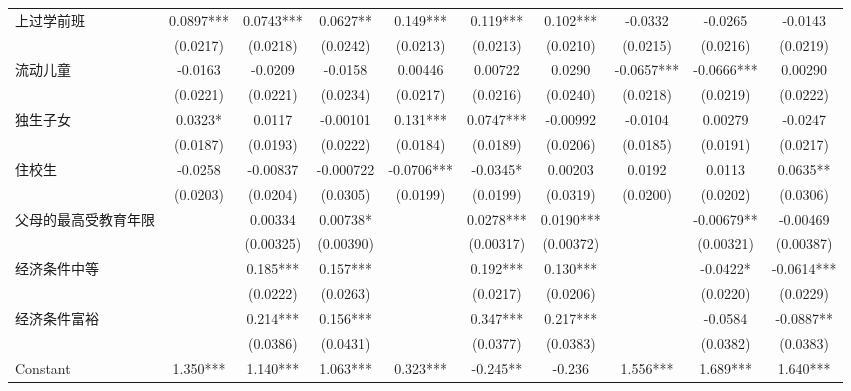 \documentclass{beamer}
\begin{document}
\begin{frame}
\begin{table}[!htbp]
{\begin{tabular}{lccccccccc}
上过学前班        & 0.0897***  & 0.0743***  & 0.0627**   & 0.149***   & 0.119***   & 0.102***  & -0.0332    & -0.0265    & -0.0143    \\
             & (0.0217)   & (0.0218)   & (0.0242)   & (0.0213)   & (0.0213)   & (0.0210)  & (0.0215)   & (0.0216)   & (0.0219)   \\
流动儿童         & -0.0163    & -0.0209    & -0.0158    & 0.00446    & 0.00722    & 0.0290    & -0.0657*** & -0.0666*** & 0.00290    \\
             & (0.0221)   & (0.0221)   & (0.0234)   & (0.0217)   & (0.0216)   & (0.0240)  & (0.0218)   & (0.0219)   & (0.0222)   \\
独生子女         & 0.0323*    & 0.0117     & -0.00101   & 0.131***   & 0.0747***  & -0.00992  & -0.0104    & 0.00279    & -0.0247    \\
             & (0.0187)   & (0.0193)   & (0.0222)   & (0.0184)   & (0.0189)   & (0.0206)  & (0.0185)   & (0.0191)   & (0.0217)   \\
住校生          & -0.0258    & -0.00837   & -0.000722  & -0.0706*** & -0.0345*   & 0.00203   & 0.0192     & 0.0113     & 0.0635**   \\
             & (0.0203)   & (0.0204)   & (0.0305)   & (0.0199)   & (0.0199)   & (0.0319)  & (0.0200)   & (0.0202)   & (0.0306)   \\
父母的最高受教育年限   &            & 0.00334    & 0.00738*   &            & 0.0278***  & 0.0190*** &            & -0.00679** & -0.00469   \\
             &            & (0.00325)  & (0.00390)  &            & (0.00317)  & (0.00372) &            & (0.00321)  & (0.00387)  \\
经济条件中等       &            & 0.185***   & 0.157***   &            & 0.192***   & 0.130***  &            & -0.0422*   & -0.0614*** \\
             &            & (0.0222)   & (0.0263)   &            & (0.0217)   & (0.0206)  &            & (0.0220)   & (0.0229)   \\
经济条件富裕       &            & 0.214***   & 0.156***   &            & 0.347***   & 0.217***  &            & -0.0584    & -0.0887**  \\
             &            & (0.0386)   & (0.0431)   &            & (0.0377)   & (0.0383)  &            & (0.0382)   & (0.0383)   \\
Constant     & 1.350***   & 1.140***   & 1.063***   & 0.323***   & -0.245**   & -0.236    & 1.556***   & 1.689***   & 1.640***   \\

\end{tabular}}
\end{table}
\end{frame}
\end{document}
